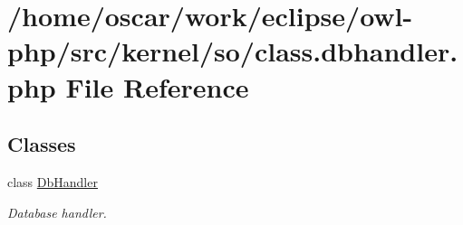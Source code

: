 \hypertarget{class_8dbhandler_8php}{
\section{/home/oscar/work/eclipse/owl-php/src/kernel/so/class.dbhandler.php File Reference}
\label{class_8dbhandler_8php}
}
\subsection*{Classes}
\begin{CompactItemize}
\item 
class \hyperlink{classDbHandler}{DbHandler}
\begin{CompactList}\small\item\em Database handler. \item\end{CompactList}\end{CompactItemize}
